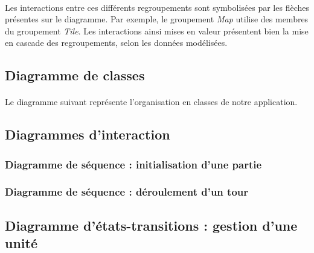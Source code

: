 \documentclass[a4paper]{article}
\begin{document}
\paragraph{}
Les interactions entre ces différents regroupements sont symbolisées par les flèches présentes sur le diagramme. Par exemple, le groupement \textit{Map} utilise des membres du groupement \textit{Tile}. Les interactions ainsi mises en valeur présentent bien la mise en cascade des regroupements, selon les données modélisées.



\subsection{Diagramme de classes}
\label{DDC}
\paragraph{}
Le diagramme suivant représente l'organisation en classes de notre application.



\subsection{Diagrammes d'interaction}

\subsubsection{Diagramme de séquence : initialisation d'une partie}

\subsubsection{Diagramme de séquence : déroulement d'un tour}

\subsection{Diagramme d'états-transitions : gestion d'une unité}
\end{document}
